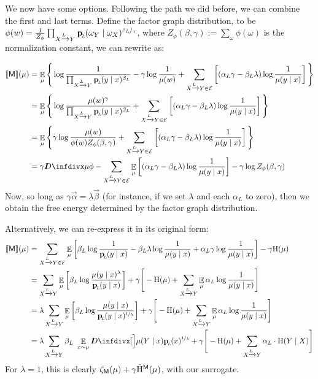 \documentclass{article}
\newcommand{\sfM}{\mathsf M}
\newcommand{\alle}[1][L]{_{ X \xrightarrow{\!\!#1} Y }}
\begin{document}
	We now have some options. Following the path we did before, we can combine the first and last terms.  Define the factor graph distribution, to be $\phi(w) = \frac{1}{Z_{\phi}}\prod\alle \bp(\omega_Y \mid \omega_X)^{\nicefrac{\beta_L}{\gamma}}$, where $Z_\phi(\beta, \gamma) := \sum_{\omega} \phi(\omega)$ is the normalization constant, we can rewrite as:
	
	\begin{align*}
		\bbr{\sfM}(\mu) &= \E_\mu \Bigg\{ \log \frac{1}{\prod\alle \bp(y\mid x)^{\beta_L}}
			- \gamma \log \frac{1}{\mu(w)} 
		 + \sum_{ X \xrightarrow{\!\!L} Y  \in \Ed } \left[
		(\alpha_L \gamma - \beta_L \lambda) \log \frac{1}{\mu(y \mid x)} \right] \Bigg\} \\
			&= \E_\mu \Bigg\{ \log \frac{\mu(w)^\gamma}{\prod\alle \bp(y\mid x)^{\beta_L}} 
		+ \sum_{ X \xrightarrow{\!\!L} Y  \in \Ed } \left[
		(\alpha_L \gamma - \beta_L \lambda) \log \frac{1}{\mu(y \mid x)} \right] \Bigg\} \\
			&= \E_\mu \Bigg\{ \gamma \log \frac{\mu(w)}{\phi(w) Z_\phi(\beta,\gamma)} 
		+ \sum_{ X \xrightarrow{\!\!L} Y  \in \Ed } \left[
		(\alpha_L \gamma - \beta_L \lambda) \log \frac{1}{\mu(y \mid x)} \right] \Bigg\} \\
		&=   \gamma \kldiv{\mu}{\phi} - \sum_{ X \xrightarrow{\!\!L} Y  \in \Ed }\E_\mu \left[
		(\alpha_L \gamma - \beta_L \lambda) \log \frac{1}{\mu(y \mid x)} \right] - \gamma \log Z_\phi(\beta,\gamma) \\
	\end{align*}
	Now, so long as $\gamma\vec\alpha = \lambda \vec\beta$ (for instance, if we set $\lambda$ and each $\alpha_L$ to zero), then we obtain the free energy determined by the factor graph distribution.
	
	Alternatively, we can re-express it in its original form:
	\begin{align*}
		\bbr{\sfM}(\mu) &=\sum_{ X \xrightarrow{\!\!L} Y  \in \Ed } \E_\mu  \left[
		\beta_L \log \frac{1}{\bp(y\mid x)} - \beta_L \lambda \log \frac{1}{\mu(y \mid x)} + \alpha_L \gamma \log \frac{1}{\mu(y\mid x)}  \right] - \gamma \H(\mu) \\
		&= \sum_{ X \xrightarrow{\!\!L} Y } \E_\mu  \left[
		\beta_L \log \frac{\mu(y \mid x)^\lambda}{\bp(y\mid x)} \right] + \gamma \Bigg[  - \H(\mu) + \sum_{ X \xrightarrow{\!\!L} Y } \E_\mu \alpha_L  \log \frac{1}{\mu(y\mid x)} \Bigg] \\
		&= \lambda \sum_{ X \xrightarrow{\!\!L} Y } \E_\mu  \left[
		\beta_L \log \frac{\mu(y \mid x)}{\bp(y\mid x)^{\nicefrac{1}{\lambda}}} \right] + \gamma \Bigg[  - \H(\mu) + \sum_{ X \xrightarrow{\!\!L} Y } \E_\mu \alpha_L  \log \frac{1}{\mu(y\mid x)} \Bigg] \\
		&= \lambda \sum_{ X \xrightarrow{\!\!L} Y }\beta_L\ \E_{x \sim \mu}  \kldiv[\Big]{\mu(Y\mid x)}{\bp(x)^{\nicefrac{1}{\lambda}}} + \gamma \Bigg[  - \H(\mu) + \sum_{ X \xrightarrow{\!\!L} Y } \alpha_L \cdot\H(Y \mid X)\Bigg] \\
	\end{align*}
	For $\lambda = 1$, this is clearly $\zeta_\sfM(\mu) + \gamma \tilde \H^\sfM(\mu)$, with our surrogate. 
	
\end{document}

